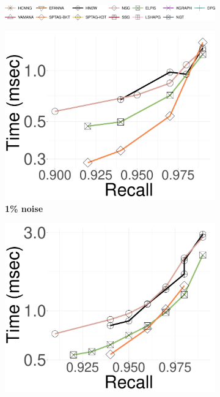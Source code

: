 \renewcommand{\soneM}{0.28}
\begin{figure}[!htb]
\captionsetup{justification=centering}
	\centering
		\begin{subfigure}{\textwidth}
			\includegraphics[width=\textwidth]{../img/Experiments/legendall.png}
		\end{subfigure}	
		\captionsetup{justification=centering}
		\captionsetup[subfigure]{justification=centering}
		\begin{subfigure}{\soneM\textwidth}
  \centering
		\includegraphics[width=\textwidth]{../img/Experiments/search/25/deep1p_10nn.pdf}
		\caption{\textbf{1\% noise}} 
		\label{fig:search:query:performance:25GB:hard:1p}
		\end{subfigure}
    \hspace{0.4cm}
  		\begin{subfigure}{\soneM\textwidth}
  \centering
		\includegraphics[width=\textwidth]{../img/Experiments/search/25/deep5p_10nn.pdf}

\end{subfigure}
\end{figure}

